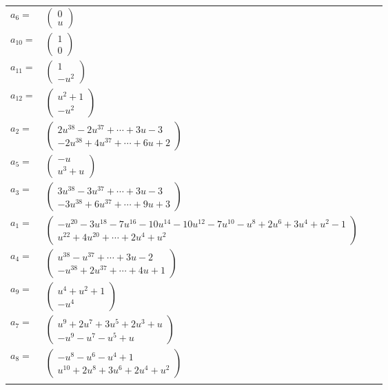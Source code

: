 \documentclass[1p]{elsarticle_modified}
\theoremstyle{definition}
\begin{document}
\begin{tabular}{m{7pt} m{180pt} m{7pt} m{180pt} }
\flushright $a_{6}=$&$\begin{pmatrix}0\\u\end{pmatrix}$ \\
\flushright $a_{10}=$&$\begin{pmatrix}1\\0\end{pmatrix}$ \\
\flushright $a_{11}=$&$\begin{pmatrix}1\\- u^2\end{pmatrix}$ \\
\flushright $a_{12}=$&$\begin{pmatrix}u^2+1\\- u^2\end{pmatrix}$ \\
\flushright $a_{2}=$&$\begin{pmatrix}2 u^{38}-2 u^{37}+\cdots+3 u-3\\-2 u^{38}+4 u^{37}+\cdots+6 u+2\end{pmatrix}$ \\
\flushright $a_{5}=$&$\begin{pmatrix}- u\\u^3+u\end{pmatrix}$ \\
\flushright $a_{3}=$&$\begin{pmatrix}3 u^{38}-3 u^{37}+\cdots+3 u-3\\-3 u^{38}+6 u^{37}+\cdots+9 u+3\end{pmatrix}$ \\
\flushright $a_{1}=$&$\begin{pmatrix}- u^{20}-3 u^{18}-7 u^{16}-10 u^{14}-10 u^{12}-7 u^{10}- u^8+2 u^6+3 u^4+u^2-1\\u^{22}+4 u^{20}+\cdots+2 u^4+u^2\end{pmatrix}$ \\
\flushright $a_{4}=$&$\begin{pmatrix}u^{38}- u^{37}+\cdots+3 u-2\\- u^{38}+2 u^{37}+\cdots+4 u+1\end{pmatrix}$ \\
\flushright $a_{9}=$&$\begin{pmatrix}u^4+u^2+1\\- u^4\end{pmatrix}$ \\
\flushright $a_{7}=$&$\begin{pmatrix}u^9+2 u^7+3 u^5+2 u^3+u\\- u^9- u^7- u^5+u\end{pmatrix}$ \\
\flushright $a_{8}=$&$\begin{pmatrix}- u^8- u^6- u^4+1\\u^{10}+2 u^8+3 u^6+2 u^4+u^2\end{pmatrix}$\\&\end{tabular}
\end{document}
